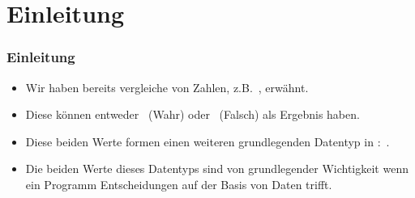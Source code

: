 \documentclass[aspectratio=169,mathserif,notheorems]{beamer}%
\subtitle{10.~Der Datentyp bool}%
\begin{document}
%
%
\startPresentation%
%
\section{Einleitung}%
\begin{frame}%
\frametitle{Einleitung}%
\begin{itemize}%
\item Wir haben bereits vergleiche von Zahlen, z.B.~, erwähnt.%
\item<2-> Diese können entweder ~(Wahr) oder ~(Falsch) als Ergebnis haben.%
\item<3-> Diese beiden Werte formen einen weiteren grundlegenden Datentyp in \python:~.%
\item<4-> Die beiden Werte dieses Datentyps sind von grundlegender Wichtigkeit wenn ein Programm Entscheidungen auf der Basis von Daten trifft.%
\end{itemize}%
\end{frame}%
%
\end{document}
